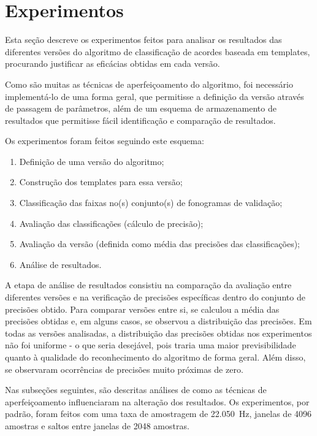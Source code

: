 \section{Experimentos}

    Esta seção descreve os experimentos feitos para analisar os resultados das diferentes versões do algoritmo de classificação de acordes baseada em templates, procurando justificar as eficácias obtidas em cada versão.
    
    Como são muitas as técnicas de aperfeiçoamento do algoritmo, foi necessário implementá-lo de uma forma geral, que permitisse a definição da versão através de passagem de parâmetros, além de um esquema de armazenamento de resultados que permitisse fácil identificação e comparação de resultados.
    
    Os experimentos foram feitos seguindo este esquema:
    
    \begin{enumerate}
        \item Definição de uma versão do algoritmo;
        \item Construção dos templates para essa versão;
        \item Classificação das faixas no(s) conjunto(s) de fonogramas de validação;
        \item Avaliação das classificações (cálculo de precisão);
        \item Avaliação da versão (definida como média das precisões das classificações);
        \item Análise de resultados.
    \end{enumerate}
    
    A etapa de análise de resultados consistiu na comparação da avaliação entre diferentes versões e na verificação de precisões específicas dentro do conjunto de precisões obtido. Para comparar versões entre si, se calculou a média das precisões obtidas e, em alguns casos, se observou a distribuição das precisões. Em todas as versões analisadas, a distribuição das precisões obtidas nos experimentos não foi uniforme - o que seria desejável, pois traria uma maior previsibilidade quanto à qualidade do reconhecimento do algoritmo de forma geral. Além disso, se observaram ocorrências de precisões muito próximas de zero.
    
    Nas subseções seguintes, são descritas análises de como as técnicas de aperfeiçoamento influenciaram na alteração dos resultados. Os experimentos, por padrão, foram feitos com uma taxa de amostragem de 22.050~Hz, janelas de 4096 amostras e saltos entre janelas de 2048 amostras.
    
